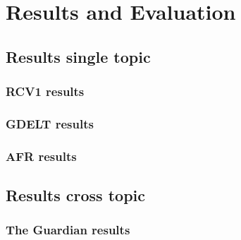 \chapter{Results and Evaluation}

\section{Results single topic}
\subsection{RCV1 results}
\subsection{GDELT results}
\subsection{AFR results}

\section{Results cross topic}
\subsection{The Guardian results}
